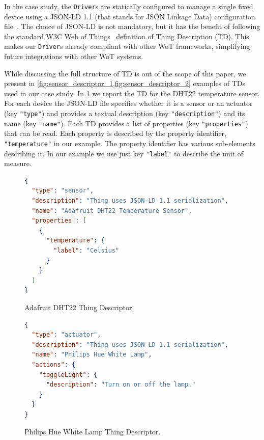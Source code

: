 In the case study, the \texttt{Driver}s are statically configured to manage a
single fixed device using a JSON-LD 1.1 (that stands for JSON Linkage Data)
configuration file~\cite{jsonld}. The choice of JSON-LD is not mandatory, but
it has the benefit of following the standard W3C Web of Things~\cite{w3c17}
definition of Thing Description (TD). This makes our \texttt{Driver}s already
compliant with other WoT frameworks, simplifying future integrations with
other WoT systems.

While discussing the full structure of TD is out of the scope of this
paper, we present in \cref{fig:sensor_descriptor_1,fig:sensor_descriptor_2} examples of TDs used in our
case study. In \cref{fig:sensor_descriptor_1} we report the TD
for the DHT22 temperature sensor. For each device the JSON-LD file
specifies whether it is a sensor or an actuator (key \lstinline|"type"|) and
provides a textual description (key \lstinline|"description"|) and its name
(key \lstinline|"name"|). Each TD provides a list of
properties (key \lstinline|"properties"|) that can be read. Each property is
described by the property identifier, \lstinline{"temperature"} in our
example. The property identifier has various sub-elements describing it. In
our example we use just key \lstinline{"label"} to describe the unit of
measure.


\begin{figure}[b]
  \centering
  \begin{lstlisting}[language=json]
{
  "type": "sensor",
  "description": "Thing uses JSON-LD 1.1 serialization",
  "name": "Adafruit DHT22 Temperature Sensor",
  "properties": [
    {
      "temperature": {
        "label": "Celsius"
      }
    }
  ]
}
\end{lstlisting}
\caption{Adafruit DHT22 Thing Descriptor.}
  \label{fig:sensor_descriptor_1}
\end{figure}


\begin{figure}[tb]
\centering
\begin{lstlisting}[language=json]
{
  "type": "actuator",
  "description": "Thing uses JSON-LD 1.1 serialization",
  "name": "Philips Hue White Lamp",
  "actions": {
    "toggleLight": {
      "description": "Turn on or off the lamp."
    }
  }
}
\end{lstlisting}
  \caption{Philips Hue White Lamp Thing Descriptor.}
  \label{fig:sensor_descriptor_2}
\end{figure}

